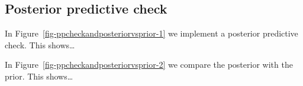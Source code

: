 \documentclass[
  letterpaper,
  DIV=11,
  numbers=noendperiod]{scrartcl}
\begin{document}
\hypertarget{posterior-predictive-check}{%
\subsection{Posterior predictive
check}\label{posterior-predictive-check}}

In Figure~\ref{fig-ppcheckandposteriorvsprior-1} we implement a
posterior predictive check. This shows\ldots{}

In Figure~\ref{fig-ppcheckandposteriorvsprior-2} we compare the
posterior with the prior. This shows\ldots{}

\begin{figure}

\begin{minipage}[t]{0.50\linewidth}

{\centering 


}

\end{minipage}%
%
\begin{minipage}[t]{0.50\linewidth}

{\centering 

}
\end{minipage}
\end{figure}
\end{document}
